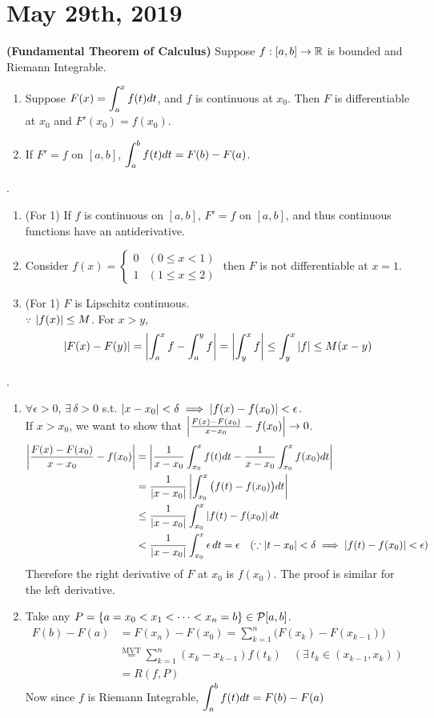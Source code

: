 \section*{May 29th, 2019}
 \textbf{(Fundamental Theorem of Calculus)} Suppose $f:[a, b]\rightarrow\mathbb{R}$ is bounded and Riemann Integrable.
\begin{enumerate}
	\item Suppose $F(x) = \displaystyle \int_a^x f(t)dt$, and $f$ is continuous at $x_0$. Then $F$ is differentiable at $x_0$ and $F'(x_0) = f(x_0)$.
	\item If $F' = f$ on $[a, b]$, $\displaystyle \int_a^b f(t) dt = F(b)-F(a)$.
\end{enumerate}
\rmk.
\begin{enumerate}
	\item (For 1) If $f$ is continuous on $[a, b]$, $F' = f$ on $[a, b]$, and thus continuous functions have an antiderivative.
	\item Consider $f(x) = \begin{cases}
		0 & (0\leq x < 1) \\ 1 & (1 \leq x \leq 2)
	\end{cases}$ then $F$ is not differentiable at $x = 1$.
	\item (For 1) $F$ is Lipschitz continuous.\\
	$\because$ $\left|f(x)\right| \leq M$. For $x > y$, $$\left|F(x) - F(y)\right| = \left|\int_a^x f - \int_a^y f\right| = \left|\int_y^x f\right| \leq \int_y^x \left|f\right| \leq M(x-y)$$
\end{enumerate}
\pf.
\begin{enumerate}
	\item $\forall\epsilon > 0$, $\exists\,\delta > 0$ s.t. $\left|x-x_0\right| < \delta \implies \left|f(x) - f(x_0)\right| < \epsilon$.\\
	If $x > x_0$, we want to show that $\left|\frac{F(x)-F(x_0)}{x-x_0} - f(x_0)\right|\rightarrow 0$.
	$$\begin{aligned}
		\left|\frac{F(x)-F(x_0)}{x-x_0} - f(x_0)\right| &= \left|\frac{1}{x-x_0}\int_{x_0}^x f(t)dt - \frac{1}{x-x_0} \int_{x_0}^xf(x_0)dt\right|\\
		&=\frac{1}{\left|x-x_0\right|} \left|\int_{x_0}^x \big(f(t)-f(x_0)\big) dt\right| \\ &\leq \frac{1}{\left|x-x_0\right|} \int_{x_0}^x \left|f(t)-f(x_0)\right|dt\\
		&< \frac{1}{\left|x-x_0\right|}\int_{x_0}^x \epsilon \,dt = \epsilon \quad (\because \left|t-x_0\right| < \delta \implies \left|f(t) - f(x_0)\right| < \epsilon)
	\end{aligned}$$
	Therefore the right derivative of $F$ at $x_0$ is $f(x_0)$. The proof is similar for the left derivative.
	\item Take any $P = \{a = x_0 < x_1 < \cdots < x_n = b\}\in \mathcal{P}[a, b]$.
	$$\begin{aligned}
		F(b)-F(a) &= F(x_n) - F(x_0) = \sum_{k=1}^{n} \big(F(x_k) - F(x_{k-1})\big) \\ &\overset{\text{MVT}}{=} \sum_{k=1}^n (x_k - x_{k-1}) f(t_k) \quad(\exists\, t_k \in (x_{k-1}, x_k)) \\
		&=R(f, P)
	\end{aligned}$$
	Now since $f$ is Riemann Integrable, $\displaystyle\int_a^b f(t)dt = F(b)-F(a)$
\end{enumerate}~\\
